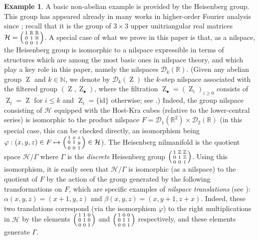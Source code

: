 \documentclass[a4paper,12pt,reqno]{amsart}
\theoremstyle{definition}
\newtheorem{example}[theorem]{Example}
\newcommand{\mc}{\mathcal}
\newcommand{\mb}{\mathbb}
\newcommand{\id}{\mathrm{id}}
\DeclareMathOperator{\ab}{Z}
\begin{document}
\begin{example}
A basic non-abelian example is provided by the Heisenberg group. This group has appeared already in many works in higher-order Fourier analysis since \cite{GT08}; recall that it is the group of $3\times 3$ upper unitriangular real matrices $\mc{H}= \begin{psmallmatrix} 1 & \mb{R} & \mb{R}\\[0.1em]0  & 1 & \mb{R}\\[0.1em] 0 & 0 & 1 \end{psmallmatrix}\vspace{0.05cm}$. A special case of what we prove in this paper is that, as a nilspace, the Heisenberg group is isomorphic to a nilspace expressible in terms of structures which are among the most basic ones in nilspace theory, and which play a key role in this paper, namely the nilspaces $\mc{D}_k(\mb{R})$. (Given any abelian group $\ab$ and $k\in\mb{N}$, we denote by $\mc{D}_k(\ab)$ the $k$-step nilspace associated with the filtered group $(\ab,\ab_\bullet)$, where the filtration $\ab_\bullet=(\ab_i)_{i\geq 0}$ consists of $\ab_i=\ab$ for $i\leq k$ and $\ab_i=\{\id\}$ otherwise; see \cite[\S 2.2.4]{Cand:Notes1}.) Indeed, the group nilspace consisting of $\mc{H}$ equipped with the Host-Kra cubes (relative to the lower-central series) is isomorphic to the product nilspace  $F=\mc{D}_1(\mb{R}^2)\times \mc{D}_2(\mb{R})$ (in this special case, this can be checked directly, an isomorphism being $\varphi:(x,y,z)\in F \mapsto \begin{psmallmatrix} 1 & x & z\\[0.1em]0  & 1 & y\\[0.1em] 0 & 0 & 1 \end{psmallmatrix}\in \mc{H}\vspace{0.05cm}$). The Heisenberg nilmanifold is the quotient space $\mc{H}/\Gamma$ where $\Gamma$ is the \emph{discrete} Heisenberg group $\begin{psmallmatrix} 1 & \mb{Z} & \mb{Z}\\[0.1em]0  & 1 & \mb{Z}\\[0.1em] 0 & 0 & 1 \end{psmallmatrix}\vspace{0.05cm}$. Using this isomorphism, it is easily seen that $\mc{H}/\Gamma$ is isomorphic (as a nilspace) to the quotient of $F$ by the action of the group generated by the following transformations on $F$, which are specific examples of \emph{nilspace translations} (see \cite[\S 3.2.4]{Cand:Notes1}): $\alpha(x,y,z)=(x+1,y,z)$ and $\beta(x,y,z)=(x,y+1,z+x)$. Indeed, these two translations correspond (via the isomorphism $\varphi$) to the right multiplications in $\mc{H}$ by the elements $\begin{psmallmatrix} 1 & 1 & 0\\[0.1em]0  & 1 & 0\\[0.1em] 0 & 0 & 1 \end{psmallmatrix}$ and $\begin{psmallmatrix} 1 & 0 & 0\\[0.1em] 0  & 1 & 1\\[0.1em] 0 & 0 & 1 \end{psmallmatrix}$ respectively, and these elements generate $\Gamma$.
\end{example}
\end{document}
